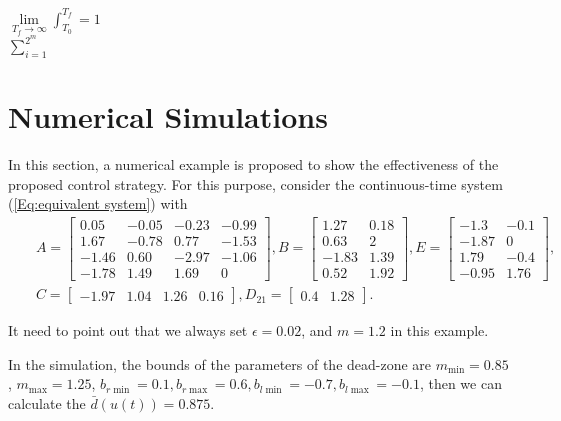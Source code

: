 \documentclass[journal,onecolumn]{IEEEtran}
\begin{document}
$\lim\limits_{T_f\rightarrow\infty}\int_{T_0}^{T_f}=1$\\
$\sum\limits_{i=1}^{2^m}$







\section{Numerical Simulations}
In this section,  a numerical example is proposed to show the
effectiveness of the proposed control strategy. For this purpose,
consider the continuous-time system  (\ref{Eq:equivalent system})
with
\begin{eqnarray}\label{Eq:Continuous-time System example}
&&A=\left[\begin{array}{cccc}0.05 &  -0.05  &  -0.23  &  -0.99\\
    1.67 & -0.78  & 0.77  & -1.53\\
   -1.46&    0.60  & -2.97  & -1.06\\
   -1.78  &  1.49  &  1.69  &  0\end{array}
\right], B=\left[\begin{array}{cc}1.27 &   0.18\\
    0.63  &  2\\
   -1.83  &  1.39\\
    0.52 &   1.92\end{array}
\right],
E=\left[\begin{array}{ll}-1.3 &  -0.1\\
   -1.87 &   0\\
    1.79  & -0.4\\
   -0.95 &   1.76\end{array}
\right],\nonumber\\[1mm]&&
C=\left[\begin{array}{cccc}-1.97 &   1.04 &   1.26& 0.16\end{array}
\right], D_{21}=\left[\begin{array}{cc}0.4  &
1.28\end{array}\right].
\end{eqnarray}



It need to point out that we always set $\epsilon=0.02$, and $m=1.2$
in this example.


In the simulation, the bounds of the parameters of the dead-zone are
$m_{\min }=0.85$, $m_{\max}=1.25$, $b_{r\min}=0.1, b_{r\max}=0.6,
b_{l\min}=-0.7, b_{l\max}=-0.1 $, then we can calculate the $\bar
d(u(t))=0.875$.
\end{document}
